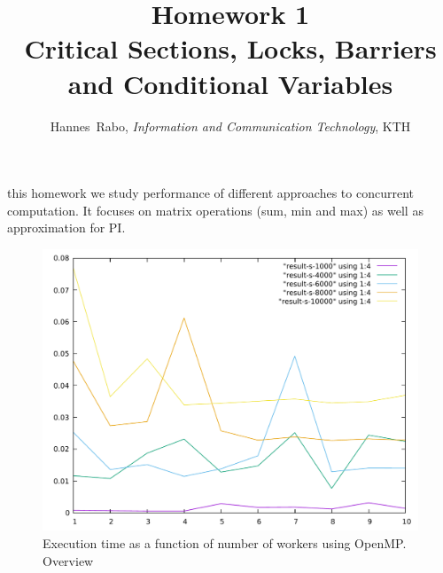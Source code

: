 \documentclass[journal]{IEEEtran}
\begin{document}
\title{Homework 1 \\Critical Sections, Locks, Barriers and Conditional Variables }

\author{Hannes~Rabo, \textit{Information and Communication Technology}, KTH}


%
{}

\maketitle



 this homework we study performance of different approaches to concurrent computation. It focuses on matrix operations (sum, min and max) as well as approximation for PI.

\newpage
\onecolumn

\begin{figure}[h]
\centering
\includegraphics[width=\textwidth]{compare-all}
\caption{Execution time as a function of number of workers using OpenMP. Overview}
\label{fig:all}
\end{figure}
\end{document}
